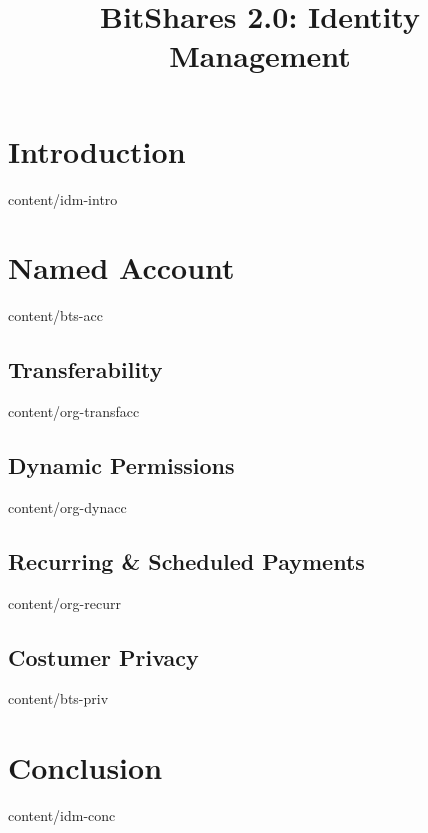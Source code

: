 \documentclass{btswhitepaper}
\title{BitShares 2.0: Identity Management}
\begin{document}
\maketitle

\begin{abstract}%
\end{abstract}

\section    { Introduction                    }  { content/idm-intro     } 

\section    { Named Account                   }  { content/bts-acc       } 
\subsection { Transferability                 }  { content/org-transfacc } 
\subsection { Dynamic Permissions             }  { content/org-dynacc    } 
\subsection { Recurring \& Scheduled Payments }  { content/org-recurr    } 
\subsection { Costumer Privacy                }  { content/bts-priv      } 

\section    { Conclusion                      }  { content/idm-conc      } 



\end{document}
